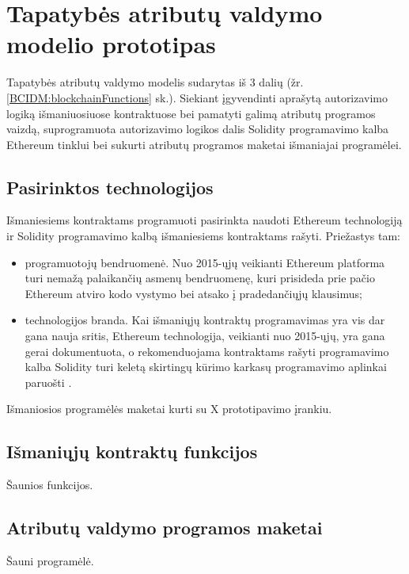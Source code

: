 \section{Tapatybės atributų valdymo modelio prototipas}

Tapatybės atributų valdymo modelis sudarytas iš 3 dalių (žr.\ref{BCIDM:blockchainFunctions} sk.). Siekiant įgyvendinti
aprašytą autorizavimo logiką išmaniuosiuose kontraktuose bei pamatyti galimą atributų programos vaizdą, suprogramuota autorizavimo
logikos dalis Solidity programavimo kalba Ethereum tinklui bei sukurti atributų programos maketai išmaniajai programėlei.

\subsection{Pasirinktos technologijos}

Išmaniesiems kontraktams programuoti pasirinkta naudoti Ethereum technologiją ir Solidity programavimo
kalbą išmaniesiems kontraktams rašyti. Priežastys tam:

\begin{itemize}
    \item programuotojų bendruomenė. Nuo 2015-ųjų veikianti Ethereum platforma turi nemažą
    palaikančių asmenų bendruomenę, kuri prisideda prie pačio Ethereum atviro kodo vystymo
    bei atsako į pradedančiųjų klausimus;
    \item technologijos branda. Kai išmaniųjų kontraktų programavimas yra vis dar gana nauja sritis,
    Ethereum technologija, veikianti nuo 2015-ųjų, yra gana gerai dokumentuota, o rekomenduojama kontraktams rašyti programavimo kalba
    Solidity \cite{Ethereum} turi keletą skirtingų kūrimo karkasų programavimo aplinkai paruošti \cite{SolidityDocumentation}.
\end{itemize}

Išmaniosios programėlės maketai kurti su X prototipavimo įrankiu.

\subsection{Išmaniųjų kontraktų funkcijos}

Šaunios funkcijos.

\subsection{Atributų valdymo programos maketai}

Šauni programėlė.